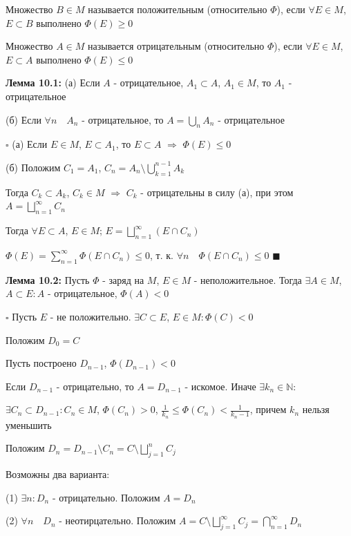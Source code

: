 \documentclass[a4paper]{report}
\begin{document}
Множество $B\in M$ называется положительным (относительно $\Phi$), если $\forall E\in M$, $E\subset B$ выполнено $\Phi(E)\ge0$ 

Множество $A\in M$ называется отрицательным (относительно $\Phi$), если $\forall E\in M$, $E\subset A$ выполнено $\Phi(E)\le0$
\bigskip

\noindent\textbf{Лемма 10.1:} (а) Если $A$ - отрицательное, $A_1\subset A$, $A_1\in M$, то $A_1$ - отрицательное

(б) Если $\forall n\quad A_n$ - отрицательное, то $A=\bigcup\limits_n A_n$ - отрицательное

\noindent $\square$ (а) Если $E\in M$, $E\subset A_1$, то $E\subset A$ $\Rightarrow$ $\Phi(E)\le0$

(б) Положим $C_1=A_1$, $C_n=A_n\setminus\bigcup\limits_{k=1}^{n-1}A_k$

Тогда $C_k\subset A_k$, $C_k\in M$ $\Rightarrow$ $C_k$ - отрицательны в силу (а), при этом $A=\bigsqcup\limits_{n=1}^\infty C_n$

Тогда $\forall E\subset A$, $E\in M$; $E=\bigsqcup\limits_{n=1}^\infty(E\cap C_n)$

$\Phi(E)=\sum\limits_{n=1}^\infty\Phi(E\cap C_n)\le0$, т. к. $\forall n\quad\Phi(E\cap C_n)\le0$ $\blacksquare$
\bigskip

\noindent\textbf{Лемма 10.2:} Пусть $\Phi$ - заряд на $M$, $E\in M$ - неположительное. Тогда $\exists A\in M$, $A\subset E\colon A$ - отрицательное, $\Phi(A)<0$

\noindent $\square$ Пусть $E$ - не положительно. $\exists C\subset E$, $E\in M\colon\Phi(C)<0$

Положим $D_0=C$

Пусть построено $D_{n-1}$, $\Phi(D_{n-1})<0$

Если $D_{n-1}$ - отрицательно, то $A=D_{n-1}$ - искомое. Иначе $\exists k_n\in\mathbb N\colon$

\noindent$\exists C_n\subset D_{n-1}\colon C_n\in M$, $\Phi(C_n)>0$, $\displaystyle\frac{1}{k_n}\le\Phi(C_n)<\displaystyle\frac{1}{k_n-1}$, причем $k_n$ нельзя уменьшить

Положим $D_n=D_{n-1}\setminus C_n=C\setminus\bigsqcup\limits_{j=1}^n C_j$

Возможны два варианта:

(1) $\exists n\colon D_n$ - отрицательно. Положим $A=D_n$

(2) $\forall n\quad D_n$ - неотирцательно. Положим $A=C\setminus\bigsqcup\limits_{j=1}^\infty C_j=\bigcap\limits_{n=1}^\infty D_n$
\end{document}
